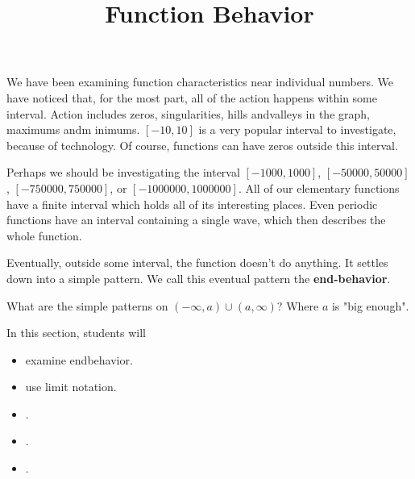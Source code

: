 \documentclass{ximera}
\title{Function Behavior}
\begin{document}
\begin{abstract}
\end{abstract}
\maketitle




We have been examining function characteristics near individual numbers. We have noticed that, for the most part, all of the action happens within some interval.  Action includes zeros, singularities, hills andvalleys in the graph, maximums andm inimums.  $[-10, 10]$  is a very popular interval to investigate, because of technology.  Of course, functions can have zeros outside this interval.  

Perhaps we should be investigating the interval $[-1000, 1000]$, $[-50000, 50000]$, $[-750000, 750000]$, or $[-1000000, 1000000]$. All of our elementary functions have a finite interval which holds all of its interesting places.  Even periodic functions have an interval containing a single wave, which then describes the whole function.

Eventually, outside some interval, the function doesn't do anything.  It settles down into a simple pattern.  We call this eventual pattern the \textbf{end-behavior}.



What are the simple patterns on $(-\infty, a) \cup (a, \infty)$?  Where $a$ is "big enough".











\begin{sectionOutcomes}
In this section, students will 

\begin{itemize}
\item examine endbehavior.
\item use limit notation.
\item .
\item .
\item .
\end{itemize}
\end{sectionOutcomes}
\end{document}
